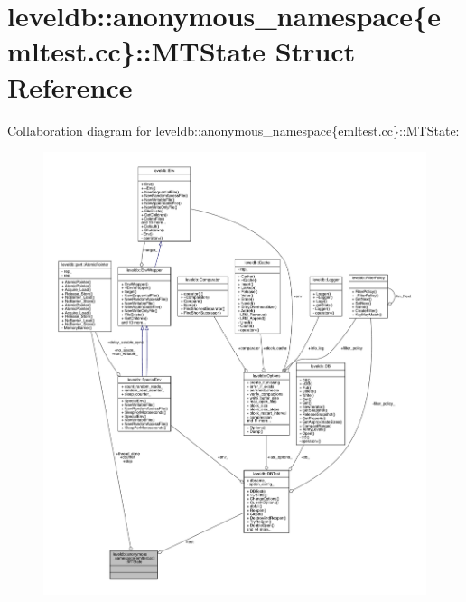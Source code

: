 \hypertarget{structleveldb_1_1anonymous__namespace_02emltest_8cc_03_1_1_m_t_state}{}\section{leveldb\+:\+:anonymous\+\_\+namespace\{emltest.\+cc\}\+:\+:M\+T\+State Struct Reference}
\label{structleveldb_1_1anonymous__namespace_02emltest_8cc_03_1_1_m_t_state}


Collaboration diagram for leveldb\+:\+:anonymous\+\_\+namespace\{emltest.\+cc\}\+:\+:M\+T\+State\+:
\nopagebreak
\begin{figure}[H]
\begin{center}
\leavevmode
\includegraphics[width=350pt]{structleveldb_1_1anonymous__namespace_02emltest_8cc_03_1_1_m_t_state__coll__graph}
\end{center}
\end{figure}

